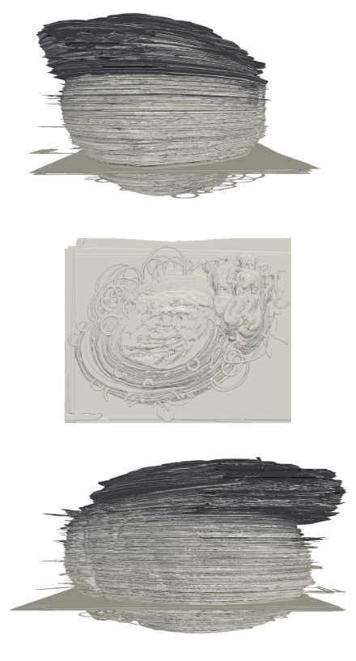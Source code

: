 \begin{figure}
  \centering
  \includegraphics[width=0.9\textheight]{Ch7/Figs/Rat28/contours/whole_positive_y_size}
  \caption{}
  \label{fig:image1.png}
\end{figure}

\begin{figure}
  \centering
  \includegraphics[width=0.9\textheight]{Ch7/Figs/Rat28/contours/whole_positive_z_size}
  \caption{}
  \label{fig:image1.png}
\end{figure}

\begin{figure}
  \centering
  \includegraphics[width=0.9\textheight]{Ch7/Figs/Rat28/contours/whole_positive_x_affine}
  \caption{}
  \label{fig:image1.png}
\end{figure}

